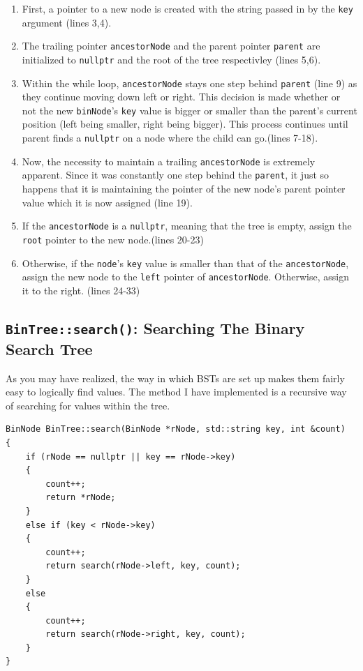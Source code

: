 \documentclass[letterpaper, 10pt]{article}
\begin{document}
\begin{enumerate}
    \item First, a pointer to a new node is created with the string passed in by the \texttt{key} argument (lines 3,4).
    \item The trailing pointer \texttt{ancestorNode} and the parent pointer \texttt{parent} are initialized to \texttt{nullptr} and the root of the tree respectivley (lines 5,6).
    \item Within the while loop, \texttt{ancestorNode} stays one step behind \texttt{parent} (line 9) as they continue moving down left or right. This decision is made whether or not the new \texttt{binNode}'s \texttt{key} value is bigger or smaller than the parent's current position (left being smaller, right being bigger). This process continues until parent finds a \texttt{nullptr} on a node where the child can go.(lines 7-18).
    \item Now, the necessity to maintain a trailing \texttt{ancestorNode} is extremely apparent. Since it was constantly one step behind the \texttt{parent}, it just so happens that it is maintaining the pointer of the new node's parent pointer value which it is now assigned (line 19).
    \item If the \texttt{ancestorNode} is a \texttt{nullptr}, meaning that the tree is empty, assign the \texttt{root} pointer to the new node.(lines 20-23)
    \item  Otherwise, if the \texttt{node}'s \texttt{key} value is smaller than that of the \texttt{ancestorNode}, assign the new node to the \texttt{left} pointer of \texttt{ancestorNode}. Otherwise, assign it to the right. (lines 24-33)
\end{enumerate}

\subsection{\texttt{BinTree::search()}: Searching The Binary Search Tree}

As you may have realized, the way in which BSTs are set up makes them fairly easy to logically find values. The method I have implemented is a recursive way of searching for values within the tree.

 \begin{addmargin}[-5em]{1em}
\begin{small}
\begin{verbatim}
BinNode BinTree::search(BinNode *rNode, std::string key, int &count)
{
    if (rNode == nullptr || key == rNode->key)
    {
        count++;
        return *rNode;
    }
    else if (key < rNode->key)
    {
        count++;
        return search(rNode->left, key, count);
    }
    else
    {
        count++;
        return search(rNode->right, key, count);
    }
}
\end{verbatim}
\end{small}
\end{addmargin}
\end{document}
